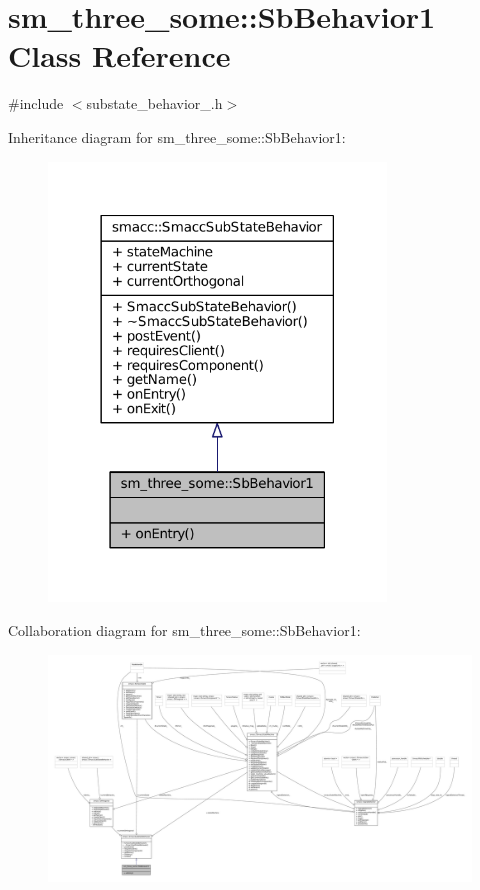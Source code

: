 \hypertarget{classsm__three__some_1_1SbBehavior1}{}\section{sm\+\_\+three\+\_\+some\+:\+:Sb\+Behavior1 Class Reference}
\label{classsm__three__some_1_1SbBehavior1}


{\ttfamily \#include $<$substate\+\_\+behavior\+\_.\+h$>$}



Inheritance diagram for sm\+\_\+three\+\_\+some\+:\+:Sb\+Behavior1\+:
\nopagebreak
\begin{figure}[H]
\begin{center}
\leavevmode
\includegraphics[width=254pt]{classsm__three__some_1_1SbBehavior1__inherit__graph}
\end{center}
\end{figure}


Collaboration diagram for sm\+\_\+three\+\_\+some\+:\+:Sb\+Behavior1\+:
\nopagebreak
\begin{figure}[H]
\begin{center}
\leavevmode
\includegraphics[width=350pt]{classsm__three__some_1_1SbBehavior1__coll__graph}
\end{center}
\end{figure}
